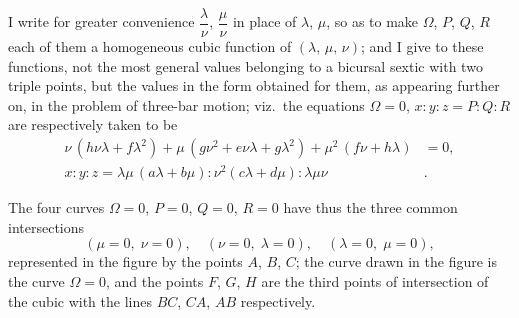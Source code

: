\documentclass[12pt,a4paper]{article}
\begin{document}
I write for greater convenience $\dfrac{\lambda}{\nu}$, $\dfrac{\mu}{\nu}$ in place of $\lambda$, $\mu$, so as to make $\Omega$, $P$, $Q$, $R$ each of them a homogeneous cubic function of $(\lambda,\,\mu,\,\nu)$; and I give to these functions, not the most general values belonging to a bicursal sextic with two triple points, but the values in the form obtained for them, as appearing further on, in the problem of three-bar motion; viz.\ the equations $\Omega=0$, $x:y:z = P:Q:R$ are respectively taken to be
\begin{align*}
\nu\,(h\nu\lambda + f\lambda^2) + \mu\,(g\nu^2 + e\nu\lambda + g\lambda^2) + \mu^2\,(f\nu + h\lambda) &= 0, \\
x:y:z = \lambda\mu\,(a\lambda+b\mu) : \nu^2(c\lambda+d\mu) : \lambda\mu\nu&.\phantom{=0}
\end{align*}

The four curves $\Omega=0$, $P=0$, $Q=0$, $R=0$ have thus the three common intersections
\[
(\mu=0,\; \nu=0),\quad (\nu=0,\; \lambda=0),\quad (\lambda=0,\; \mu=0),
\]
represented in the figure by the points $A$, $B$, $C$; the curve drawn in the figure is the curve $\Omega=0$, and the points $F$, $G$, $H$ are the third points of intersection of the cubic with the lines $BC$, $CA$, $AB$ respectively.

\begin{center}
\end{center}
\end{document}
